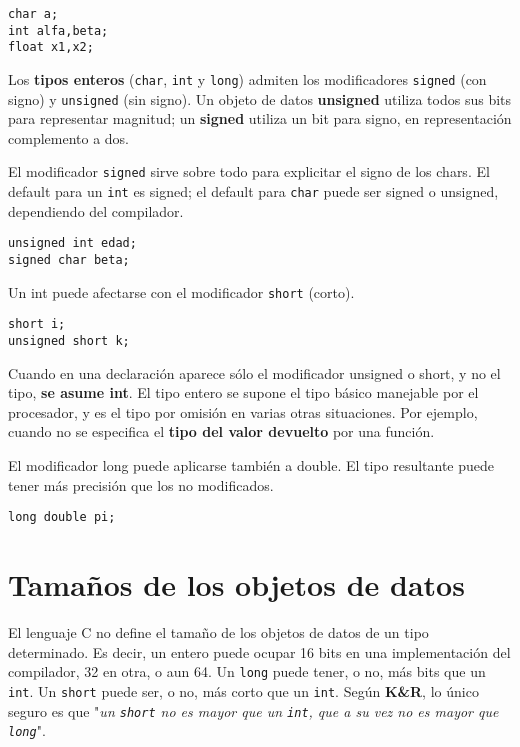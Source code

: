 \begin{lstlisting}
char a;
int alfa,beta;
float x1,x2;
\end{lstlisting}

Los \textbf{tipos enteros} (\lstinline{char}, \lstinline{int} y \lstinline{long}) admiten los modificadores \lstinline{signed} (con signo) y \lstinline{unsigned} (sin signo). Un objeto de datos \textbf{unsigned} utiliza todos sus bits para representar magnitud; un \textbf{signed} utiliza un bit para signo, en representación complemento a dos.

El modificador \lstinline{signed} sirve sobre todo para explicitar el signo de los chars. El default para un \lstinline{int} es
signed; el default para \lstinline{char} puede ser signed o unsigned, dependiendo del compilador.

\begin{lstlisting}
unsigned int edad;
signed char beta;
\end{lstlisting}


Un int puede afectarse con el modificador \lstinline{short} (corto).

\begin{lstlisting}
short i;
unsigned short k;
\end{lstlisting}


Cuando en una declaración aparece sólo el modificador unsigned o short, y no el tipo, \textbf{se asume int}. El
tipo entero se supone el tipo básico manejable por el procesador, y es el tipo por omisión en varias
otras situaciones. Por ejemplo, cuando no se especifica el \textbf{tipo del valor devuelto} por una función.

El modificador long puede aplicarse también a double. El tipo resultante puede tener más 
precisión que los no modificados.

\begin{lstlisting}
long double pi;
\end{lstlisting}

\section{Tamaños de los objetos de datos}

El lenguaje C no define el tamaño de los objetos de datos de un tipo determinado. Es decir, un entero
puede ocupar 16 bits en una implementación del compilador, 32 en otra, o aun 64. Un \lstinline{long} puede tener, o no, más bits
que un \lstinline{int}. Un \lstinline{short} puede ser, o no, más corto que un \lstinline{int}. Según \textbf{K\&R}, lo único seguro es que "\textit{un \lstinline{short} no es mayor que un \lstinline{int}, que a su vez no es mayor que \lstinline{long}}".

